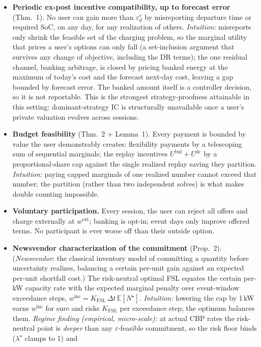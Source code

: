 \documentclass[letterpaper]{article}
\newcommand{\dt}{\Delta t}                   %
\newcommand{\wext}{w^{\mathrm{ext}}}          %
\newcommand{\Ubuf}{U^{\mathrm{buf}}}
\newcommand{\winc}{w^{\mathrm{inc}}}            %
\newcommand{\Kfsl}{K_{\mathrm{FSL}}}
\newcommand{\Udc}{U^{\mathrm{dc}}}                  %
\newcommand{\Nexc}{N^{\star}}                       %
\newcommand{\epsIC}[2]{\varepsilon^{#1}_{#2}}       %
\begin{document}
\begin{itemize}
\item \textbf{Periodic ex-post incentive compatibility, up to forecast
error} (Thm.~1). No user can gain more than
$\epsIC{v}{d}$ by misreporting departure time or required SoC, on any
day, for any realization of others.
\emph{Intuition:} misreports only shrink the feasible set of the
charging problem, so the marginal utility that prices a user's options
can only fall (a set-inclusion argument that survives any change of
objective, including the DR terms); the one residual channel, banking
arbitrage, is closed by pricing banked energy at the maximum of today's
cost and the forecast next-day cost, leaving a gap bounded by forecast
error. The banked amount itself is a controller decision, so it is not
reportable. This is the strongest strategy-proofness attainable in
this setting: dominant-strategy IC is structurally unavailable once a
user's private valuation evolves across sessions.
\item \textbf{Budget feasibility} (Thm.~2 + Lemma~1). Every payment is
bounded by value the user demonstrably creates: flexibility payments by
a telescoping sum of sequential marginals; the replay incentives
$\Ubuf + \Udc$ by a proportional-share cap against the single realized
replay saving they partition.
\emph{Intuition:} paying capped marginals of one realized number cannot
exceed that number; the partition (rather than two independent solves)
is what makes double counting impossible.
\item \textbf{Voluntary participation.} Every session, the user can
reject all offers and charge externally at $\wext$; banking is opt-in;
event days only improve offered terms. No participant is ever worse off
than their outside option.
\item \textbf{Newsvendor characterization of the commitment}
(Prop.~2). (\emph{Newsvendor}: the classical inventory model of committing a quantity before uncertainty realizes, balancing a certain per-unit gain against an expected per-unit shortfall cost.) The risk-neutral optimal FSL equates the certain per-kW
capacity rate with the expected marginal penalty over event-window
exceedance steps, $\winc = \Kfsl\,\dt\,\mathbb{E}[\Nexc]$.
\emph{Intuition:} lowering the cap by 1\,kW earns $\winc$ for sure and
risks $\Kfsl$ per exceedance step; the optimum balances them.
\emph{Regime finding (empirical, micro-scale):} at actual CBP rates the
risk-neutral point is \emph{deeper} than any $\varepsilon$-feasible
commitment, so the risk floor binds ($\lambda^{\star}$ clamps to 1) and

\end{itemize}
\end{document}
